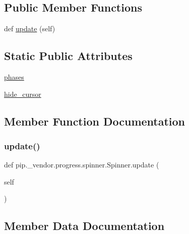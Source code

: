 \subsection*{Public Member Functions}
\begin{DoxyCompactItemize}
\item 
def \hyperlink{classpip_1_1__vendor_1_1progress_1_1spinner_1_1Spinner_a5e5421b479c8ef4e38b3e0398eee8595}{update} (self)
\end{DoxyCompactItemize}
\subsection*{Static Public Attributes}
\begin{DoxyCompactItemize}
\item 
\hyperlink{classpip_1_1__vendor_1_1progress_1_1spinner_1_1Spinner_a7f4cec389f5cad29f24ca4547f0f177e}{phases}
\item 
\hyperlink{classpip_1_1__vendor_1_1progress_1_1spinner_1_1Spinner_af768ce162cd8c31ad64895258c8f5325}{hide\+\_\+cursor}
\end{DoxyCompactItemize}


\subsection{Member Function Documentation}
\mbox{\label{classpip_1_1__vendor_1_1progress_1_1spinner_1_1Spinner_a5e5421b479c8ef4e38b3e0398eee8595}} 
\subsubsection{\texorpdfstring{update()}{update()}}
{\footnotesize\ttfamily def pip.\+\_\+vendor.\+progress.\+spinner.\+Spinner.\+update (\begin{DoxyParamCaption}\item[{}]{self }\end{DoxyParamCaption})}



\subsection{Member Data Documentation}
\mbox{\label{classpip_1_1__vendor_1_1progress_1_1spinner_1_1Spinner_af768ce162cd8c31ad64895258c8f5325}} 

